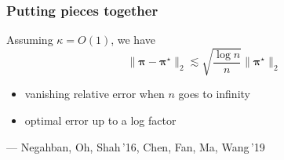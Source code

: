 \documentclass[compress,
mathserif,wide,%
]{beamer}
\begin{document}
\begin{frame}
	\frametitle{Putting pieces together}
	Assuming $\kappa = O(1)$, we have
	\[
	\|\bm{\pi}-\bm{\pi}^{\star}\|_{2} \lesssim \sqrt{\frac{\log n}{n}} \|\bm{\pi}^{\star}\|_{2}
	\]
	\begin{itemize}
		\item vanishing relative error when $n$ goes to infinity
		\item optimal error up to a log factor 
	\end{itemize}
	
	\vfill 	
	\hfill --- {\small Negahban, Oh, Shah\,'16, Chen, Fan, Ma, Wang\,'19}
\end{frame}

%
%
%
%
%
%
\end{document}

